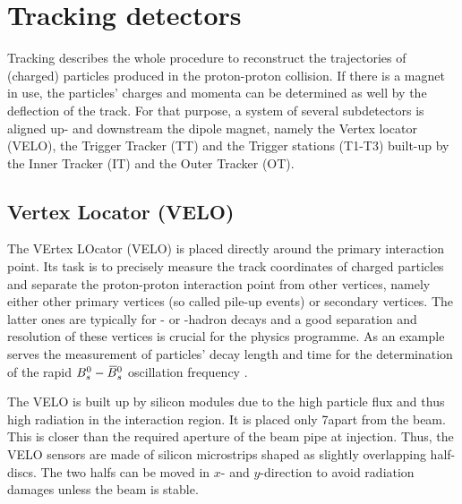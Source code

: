 \section{Tracking detectors}
Tracking describes the whole procedure to reconstruct the trajectories of (charged) particles produced in the proton-proton collision. 
If there is a magnet in use, the particles' charges and momenta can be determined as well by the deflection of the track. 
For that purpose, a system of several subdetectors is aligned up- and downstream the dipole magnet, namely the Vertex locator (VELO), the Trigger Tracker (TT) and the Trigger stations (T1-T3) built-up by the Inner Tracker (IT) and the Outer Tracker (OT).

\subsection{Vertex Locator (VELO)}
The VErtex LOcator (VELO) is placed directly around the primary interaction point. 
Its task is to precisely measure the track coordinates of charged particles and separate the proton-proton interaction point from other vertices, namely either other primary vertices (so called pile-up events) or secondary vertices. 
The latter ones are typically for \bquark- or \cquark-hadron decays \cite{VELO_TDR} and a good separation and resolution of these vertices is crucial for the \lhcb physics programme.
As an example serves the measurement of particles' decay length and time for the determination of the rapid ${{B}^0_{s}}-{{\kern 0.18em\overline{\kern -0.18em B}{}}{}^0_{s}}$ oscillation frequency \cite{BsBsbar_frequency}.

The VELO is built up by silicon modules due to the high particle flux and thus high radiation in the interaction region. 
It is placed only 7\mm apart from the beam. 
This is closer than the required aperture of the \lhcb beam pipe at injection. 
Thus, the VELO sensors are made of silicon microstrips shaped as slightly overlapping half-discs. 
The two halfs can be moved in $x$- and $y$-direction to avoid radiation damages unless the beam is stable.

